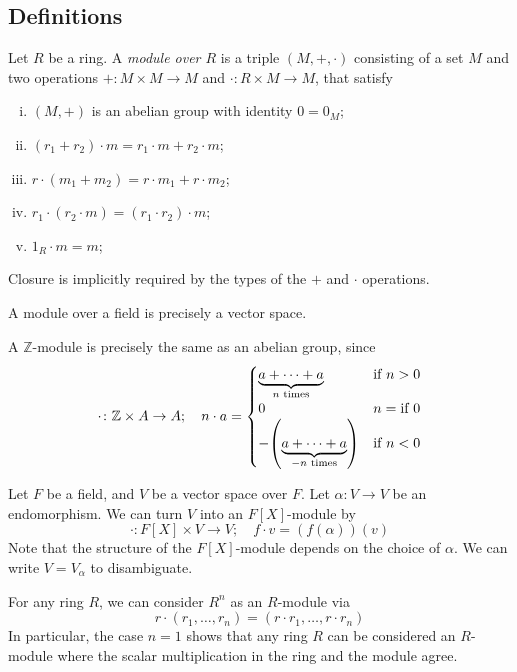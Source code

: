 \subsection{Definitions}
\begin{definition}
	Let \( R \) be a ring.
	A \textit{module over \( R \)} is a triple \( (M, +, \cdot) \) consisting of a set \( M \) and two operations \( + \colon M \times M \to M \) and \( \cdot \colon R \times M \to M \), that satisfy
	\begin{enumerate}[(i)]
		\item \( (M, +) \) is an abelian group with identity \( 0 = 0_M \);
		\item \( (r_1 + r_2) \cdot m = r_1 \cdot m + r_2 \cdot m \);
		\item \( r \cdot (m_1 + m_2) = r \cdot m_1 + r \cdot m_2 \);
		\item \( r_1 \cdot (r_2 \cdot m) = (r_1 \cdot r_2) \cdot m \);
		\item \( 1_R \cdot m = m \);
	\end{enumerate}
\end{definition}
\begin{remark}
	Closure is implicitly required by the types of the \( + \) and \( \cdot \) operations.
\end{remark}
\begin{example}
	A module over a field is precisely a vector space.

	A \( \mathbb Z \)-module is precisely the same as an abelian group, since
	\[ \cdot \colon \mathbb Z \times A \to A;\quad n \cdot a = \begin{cases}
		\underbrace{a + \dots + a}_{n \text{ times}} & \text{if } n > 0 \\
		0 & n = \text{if } 0 \\
		-\qty(\underbrace{a + \dots + a}_{-n \text{ times}}) & \text{if } n < 0
	\end{cases} \]

	Let \( F \) be a field, and \( V \) be a vector space over \( F \).
	Let \( \alpha \colon V \to V \) be an endomorphism.
	We can turn \( V \) into an \( F[X] \)-module by
	\[ \cdot \colon F[X] \times V \to V;\quad f \cdot v = (f(\alpha))(v) \]
	Note that the structure of the \( F[X] \)-module depends on the choice of \( \alpha \).
	We can write \( V = V_\alpha \) to disambiguate.

	For any ring \( R \), we can consider \( R^n \) as an \( R \)-module via
	\[ r \cdot (r_1, \dots, r_n) = (r \cdot r_1, \dots, r \cdot r_n) \]
	In particular, the case \( n = 1 \) shows that any ring \( R \) can be considered an \( R \)-module where the scalar multiplication in the ring and the module agree.
\end{example}

